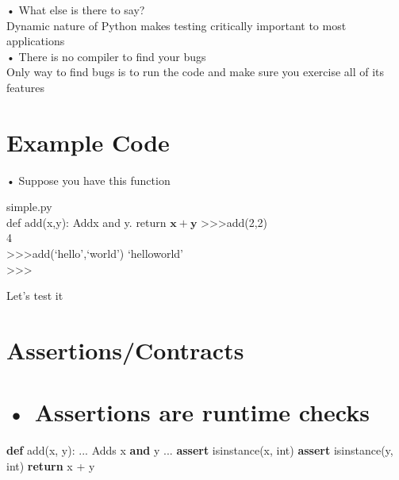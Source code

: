 \documentclass[
  letterpaper,
  DIV=11,
  numbers=noendperiod]{scrreprt}
\newenvironment{Shaded}{\begin{snugshade}}{\end{snugshade}}
\newcommand{\BuiltInTok}[1]{\textcolor[rgb]{0.00,0.23,0.31}{#1}}
\newcommand{\ControlFlowTok}[1]{\textcolor[rgb]{0.00,0.23,0.31}{\textbf{#1}}}
\newcommand{\KeywordTok}[1]{\textcolor[rgb]{0.00,0.23,0.31}{\textbf{#1}}}
\newcommand{\NormalTok}[1]{\textcolor[rgb]{0.00,0.23,0.31}{#1}}
\newcommand{\OperatorTok}[1]{\textcolor[rgb]{0.37,0.37,0.37}{#1}}
\begin{document}
• What else is there to say?\\
Dynamic nature of Python makes testing critically important to most
applications\\
• There is no compiler to find your bugs\\
Only way to find bugs is to run the code and make sure you exercise all
of its features


\chapter{Example Code}\label{example-code}

• Suppose you have this function

simple.py\\
def add(x,y): Addx and y. return \(\mathbf{x} + \mathbf{y}\)
\textgreater\textgreater\textgreater add(2,2)\\
4\\
\textgreater\textgreater\textgreater add(`hello',`world') `helloworld'\\
\textgreater\textgreater\textgreater{}

Let's test it


\chapter{Assertions/Contracts}\label{assertionscontracts}


\chapter{• Assertions are runtime
checks}\label{assertions-are-runtime-checks}

\begin{Shaded}
\begin{Highlighting}[]
\KeywordTok{def}\NormalTok{ add(x, y):}
\NormalTok{    ...}
\NormalTok{    Adds x }\KeywordTok{and}\NormalTok{ y}
\NormalTok{    ...}
    \ControlFlowTok{assert} \BuiltInTok{isinstance}\NormalTok{(x, }\BuiltInTok{int}\NormalTok{)}
    \ControlFlowTok{assert} \BuiltInTok{isinstance}\NormalTok{(y, }\BuiltInTok{int}\NormalTok{)}
    \ControlFlowTok{return}\NormalTok{ x }\OperatorTok{+}\NormalTok{ y }
\end{Highlighting}
\end{Shaded}
\end{document}
